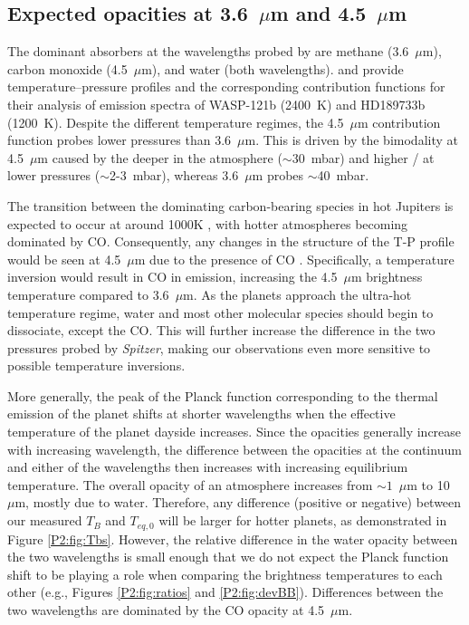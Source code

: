 \subsection{Expected opacities at 3.6~$\mu$m and 4.5~$\mu$m}

The dominant absorbers at the wavelengths probed by \spitzerIRAC are methane (3.6~$\mu$m), carbon monoxide (4.5~$\mu$m), and water (both wavelengths). \citet{Parmentier2018b} and \citet{Lee2012} provide temperature--pressure profiles and the corresponding contribution functions for their analysis of emission spectra of WASP-121b (2400~K) and HD189733b (1200~K). Despite the different temperature regimes, the 4.5~$\mu$m contribution function probes lower pressures than 3.6~$\mu$m. This is driven by the bimodality at 4.5~$\mu$m caused by the  deeper in the atmosphere ($\sim$30~mbar) and higher  /  at lower pressures ($\sim$2-3~mbar), whereas 3.6~$\mu$m probes $\sim$40~mbar.

The transition between the dominating carbon-bearing species in hot Jupiters is expected to occur at around 1000K \citep[e.g.,][]{Zahnle2014, Ebbing2016, Molaverdikhani2019}, with hotter atmospheres becoming dominated by CO. Consequently, any changes in the structure of the T-P profile would be seen at 4.5~$\mu$m due to the presence of CO \citep{Fortney2008, Parmentier2018b, Arcangeli2018}. Specifically, a temperature inversion would result in CO in emission, increasing the 4.5~$\mu$m brightness temperature compared to 3.6~$\mu$m. As the planets approach the ultra-hot temperature regime, water and most other molecular species should begin to dissociate, except the CO. This will further increase the difference in the two pressures probed by \textit{Spitzer}, making our observations even more sensitive to possible temperature inversions.

More generally, the peak of the Planck function corresponding to the thermal emission of the planet shifts at shorter wavelengths when the effective temperature of the planet dayside increases. Since the opacities generally increase with increasing wavelength, the difference between the opacities at the continuum and either of the \spitzer wavelengths then increases with increasing equilibrium temperature. The overall opacity of an atmosphere increases from $\sim1$~$\mu$m to 10~$\mu$m, mostly due to water. Therefore, any difference (positive or negative) between our measured $T_B$ and $T_{eq,\textit{0}}$ will be larger for hotter planets, as demonstrated in Figure \ref{P2:fig:Tbs}. However, the relative difference in the water opacity between the two \spitzer wavelengths is small enough that we do not expect the Planck function shift to be playing a role when comparing the brightness temperatures to each other (e.g., Figures \ref{P2:fig:ratios} and \ref{P2:fig:devBB}). Differences between the two \spitzer wavelengths are dominated by the CO opacity at 4.5~$\mu$m.

